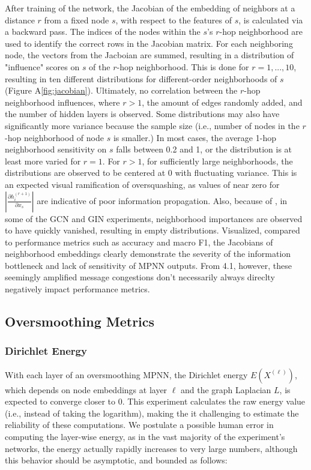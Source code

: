 \documentclass[11pt]{article}
\begin{document}
After training of the network, the Jacobian of the embedding of neighbors at a distance $r$ from a fixed node $s$, with respect to the features of $s$, is calculated via a backward pass. The indices of the nodes within the $s$'s $r$-hop neighborhood are used to identify the correct rows in the Jacobian matrix. For each neighboring node, the vectors from the Jacboian are summed, resulting in a distribution of "influence" scores on $s$ of the $r$-hop neighborhood. This is done for $r=1,...,10$, resulting in ten different distributions for different-order neighborhoods of $s$ (Figure A\ref{fig:jacobian}). Ultimately, no correlation between the $r$-hop neighborhood influences, where $r > 1$, the amount of edges randomly added, and the number of hidden layers is observed. Some distributions may also have significantly more variance because the sample size (i.e., number of nodes in the $r$-hop neighborhood of node $s$ is smaller.) In most cases, the average 1-hop neighborhood sensitivity on $s$ falls between 0.2 and 1, or the distribution is at least more varied for $r = 1$. For $r > 1$, for sufficiently large neighborhoods, the distributions are observed to be centered at 0 with fluctuating variance. This is an expected visual ramification of oversquashing, as values of near zero for $\left| \frac{\partial h_i^{(r + 1)}}{\partial x_s} \right|$ are indicative of poor information propagation. Also, because of \footnotemark[2], in some of the GCN and GIN experiments, neighborhood importances are observed to have quickly vanished, resulting in empty distributions. Visualized, compared to performance metrics such as accuracy and macro F1, the Jacobians of neighborhood embeddings clearly demonstrate the severity of the information bottleneck and lack of sensitivity of MPNN outputs. From 4.1, however, these seemingly amplified message congestions don't necessarily always direclty negatively impact performance metrics.

\subsection{Oversmoothing Metrics}
\subsubsection{Dirichlet Energy}

With each layer of an oversmoothing MPNN, the Dirichlet energy $E(X^{(\ell)})$, which depends on node embeddings at layer $\ell$ and the graph Laplacian $L$, is expected to converge closer to 0. This experiment calculates the raw energy value (i.e., instead of taking the logarithm), making the it challenging to estimate the reliability of these computations. We postulate a possible human error in computing the layer-wise energy, as in the vast majority of the experiment's networks, the energy actually rapidly increases to very large numbers, although this behavior should be asymptotic, and bounded as follows:
\end{document}
